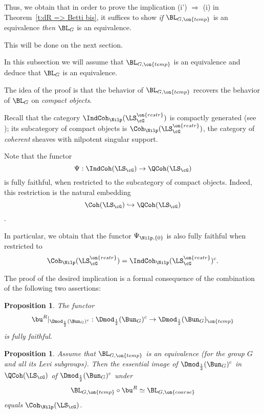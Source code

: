 \documentclass[9pt]{amsart}
\newtheorem{prop}[subsubsection]{Proposition}
\theoremstyle{remark}
\theoremstyle{definition}
\theoremstyle{remark}
\newcommand{\thmref}[1]{Theorem~\ref{#1}}
\numberwithin{equation}{section}
\begin{document}
\sssec{} \label{sss:red to temp}

Thus, we obtain that in order to prove the implication (i') $\Rightarrow$ (i) in \thmref{t:dR => Betti bis},
it suffices to show \emph{if} $\BL_{G,\on{temp}}$ is an equivalence \emph{then} $\BL_G$ is an equivalence.

\medskip

This will be done on the next section. 

 \label{ss:temp to all} 

In this subsection we will assume that $\BL_{G,\on{temp}}$ is an equivalence and deduce that
$\BL_G$ is an equivalence.
 
\medskip

The idea of the proof is that the behavior of $\BL_{G,\on{temp}}$ recovers the behavior of $\BL_G$ 
on \emph{compact objects}. 

\sssec{}

Recall that the category $\IndCoh_\Nilp(\LS^{\on{restr}}_\cG)$ is compactly generated (see \cite[Sect. 11.1.6]{AG});
its subcategory of compact objects is $\Coh_\Nilp(\LS^{\on{restr}}_\cG)$, the category of \emph{coherent} sheaves
with nilpotent singular support. 

\medskip 

Note that the functor 
$$\Psi:\IndCoh(\LS_\cG)\to \QCoh(\LS_\cG)$$
is fully faithful, when restricted to the subcategory of compact objects.
Indeed, this restriction is the natural embedding 
$$\Coh(\LS_\cG)\hookrightarrow \QCoh(\LS_\cG)$$.

\medskip

In particular, we obtain that the functor $\Psi_{\Nilp,\{0\}}$ is also fully faithful when restricted
to 
$$\Coh_\Nilp(\LS^{\on{restr}}_\cG)=\IndCoh_\Nilp(\LS^{\on{restr}}_\cG)^c.$$

\sssec{}

The proof of the desired implication is a formal consequence of the combination of the following two assertions:

\begin{prop} \label{p:uR ff on compacts}
The functor 
$$\bu^R|_{\Dmod_{\frac{1}{2}}(\Bun_G)^c}:\Dmod_{\frac{1}{2}}(\Bun_G)^c\to \Dmod_{\frac{1}{2}}(\Bun_G)_{\on{temp}}$$
is fully faithful.
\end{prop}

\begin{prop} \label{p:images}
Assume that $\BL_{G,\on{temp}}$ is an equivalence (for the group $G$ and all its Levi subgroups). 
Then the essential image of $\Dmod_{\frac{1}{2}}(\Bun_G)^c$ in $\QCoh(\LS_\cG)$ of $\Dmod_{\frac{1}{2}}(\Bun_G)^c$ under 
$$\BL_{G,\on{temp}}\circ \bu^R\simeq \BL_{G,\on{coarse}}$$ 
equals $\Coh_\Nilp(\LS_\cG)$.
\end{prop}
\end{document}
